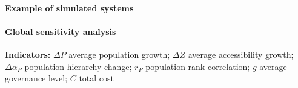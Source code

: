 \documentclass[12pt]{iopart}
\begin{document}
\paragraph{Example of simulated systems}{
 

 
 


\paragraph{Global sensitivity analysis}








\textbf{Indicators: } $\Delta P$ average population growth; $\Delta Z$ average accessibility growth; $\Delta \alpha_P$ population hierarchy change; $r_P$ population rank correlation; $g$ average governance level; $C$ total cost


}
\end{document}
